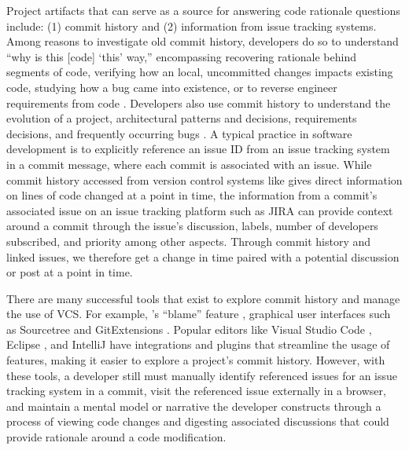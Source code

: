 Project artifacts that can serve as a source for answering code rationale questions include: (1) commit history and (2) information from issue tracking systems. 
Among reasons to investigate old commit history, developers do so to understand ``why is this [code] ‘this’ way,'' encompassing recovering rationale behind segments of code, verifying how an local, uncommitted changes impacts existing code, studying how a bug came into existence, or to reverse engineer requirements from code \cite{codoban_software_2015}. 
Developers also use commit history to understand the evolution of a project, \eg  architectural patterns and decisions, requirements decisions, and frequently occurring bugs \cite{codoban_software_2015}.
A typical practice in software development is to explicitly reference an issue ID from an issue tracking system in a commit message, where each commit is associated with an issue. 
While commit history accessed from version control systems like  gives direct information on lines of code changed at a point in time, the information from a commit's associated issue on an issue tracking platform such as JIRA \cite{jira} can provide context around a commit through the issue's discussion, labels, number of developers subscribed, and priority among other aspects.
Through commit history and linked issues, we therefore get a change in time paired with a potential discussion or post at a point in time.

There are many successful tools that exist to explore commit history and manage the use of VCS. For example, 's ``blame'' feature \cite{gitblame}, graphical user interfaces such as Sourcetree \cite{sourcetree} and GitExtensions \cite{gitextensions}. 
Popular editors like Visual Studio Code \cite{vscode}, Eclipse \cite{eclipse}, and IntelliJ \cite{intellij} have  integrations and plugins that streamline the usage of  features, making it easier to explore a project's commit history. 
However, with these tools, a developer still must manually identify referenced issues for an issue tracking system in a commit, visit the referenced issue externally in a browser, and maintain a mental model or narrative the developer constructs through a process of viewing code changes and digesting associated discussions that could provide rationale around a code modification. 


